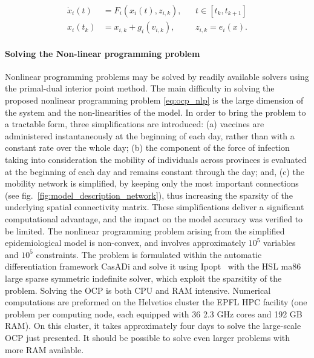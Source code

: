 \begin{align*}
\dot x_i(t) &= F_i(x_i(t),z_{i,k}), && t\in[t_k,t_{k+1}] \\
x_i(t_k) &= x_{i,k} + g_i(v_{i,k}), && z_{i,k} = e_i(x).
\end{align*}

\paragraph{Solving the Non-linear programming problem} Nonlinear programming problems may be solved by readily available solvers using the primal-dual interior point method. The main difficulty in solving the proposed nonlinear programming problem \eqref{eq:ocp_nlp} is the large dimension of the system and the non-linearities of the model. In order to bring the problem to a tractable form, three simplifications are introduced: (a) vaccines are administered instantaneously at the beginning of each day, rather than with a constant rate over the whole day; (b) the component of the force of infection taking into consideration the mobility of individuals across provinces is evaluated at the beginning of each day and remains constant through the day; and, (c) the mobility network is simplified, by keeping only the most important connections (see fig.~\ref{fig:model_description_network}), thus increasing the sparsity of the underlying spatial connectivity matrix. These simplifications deliver a significant computational advantage, and the impact on the model  accuracy was verified to be limited. 
The nonlinear programming problem arising from the simplified epidemiological model is non-convex, and involves approximately $10^{5}$ variables and $10^5$ constraints. The problem is formulated within the automatic differentiation framework CasADi\cite{Andersson:CasADiSoftwareFramework:2018} and solve it using Ipopt~\cite{Wachter:ImplementationInteriorpointFilter:2006} with the HSL ma86 large sparse symmetric indefinite solver\cite{HSLCollectionFortran}, which exploit the sparsitity of the problem. 
Solving the OCP is both CPU and RAM intensive. Numerical computations are preformed on the Helvetios cluster the EPFL HPC facility (one problem per computing node, each equipped with 36 2.3 GHz cores and 192 GB RAM). On this cluster, it takes approximately four days to solve the large-scale OCP just presented. It should be possible to solve even larger problems with more RAM available. 


